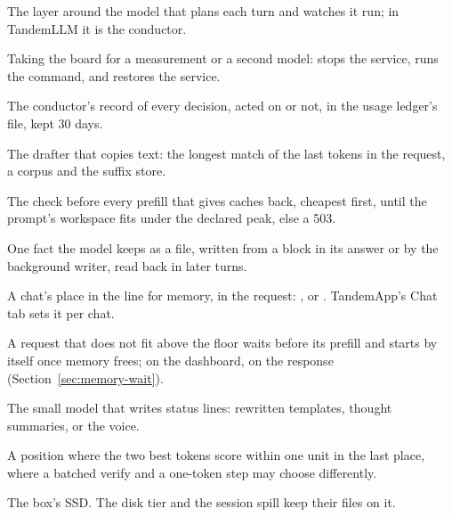 \begin{description}[style=unboxed, leftmargin=0pt, itemsep=.5ex, font=\normalfont\bfseries]
\item[harness] The layer around the model that plans each turn and watches it run; in TandemLLM it is the conductor.

\item[hold] Taking the board for a measurement or a second model:  stops the service, runs the command, and restores the service.

\item[journal] The conductor's record of every decision, acted on or not, in the usage ledger's file, kept 30 days.

\item[lookup drafter] The drafter that copies text: the longest match of the last tokens in the request, a corpus and the suffix store.

\item[memory gate] The check before every prefill that gives caches back, cheapest first, until the prompt's workspace fits under the declared peak, else a 503.

\item[memory note] One fact the model keeps as a file, written from a block in its answer or by the background writer, read back in later turns.

\item[memory priority] A chat's place in the line for memory,  in the request: ,  or . TandemApp's Chat tab sets it per chat.

\item[memory wait] A request that does not fit above the floor waits before its prefill and starts by itself once memory frees;  on the dashboard,  on the response (Section~\ref{sec:memory-wait}).

\item[narrator] The small model that writes status lines: rewritten templates, thought summaries, or the voice.

\item[near tie] A position where the two best tokens score within one unit in the last place, where a batched verify and a one-token step may choose differently.

\item[NVMe] The box's SSD. The disk tier and the session spill keep their files on it.


\end{description}
